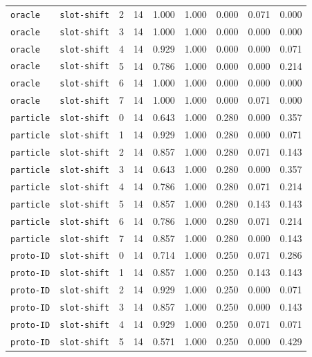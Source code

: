 \documentclass{article}
\begin{document}
\begin{center}
{\begin{tabular}{llllccccc}
\texttt{oracle} & \texttt{slot-shift} & 2 & 14 & 1.000 & 1.000 & 0.000 & 0.071 & 0.000 \\
\texttt{oracle} & \texttt{slot-shift} & 3 & 14 & 1.000 & 1.000 & 0.000 & 0.000 & 0.000 \\
\texttt{oracle} & \texttt{slot-shift} & 4 & 14 & 0.929 & 1.000 & 0.000 & 0.000 & 0.071 \\
\texttt{oracle} & \texttt{slot-shift} & 5 & 14 & 0.786 & 1.000 & 0.000 & 0.000 & 0.214 \\
\texttt{oracle} & \texttt{slot-shift} & 6 & 14 & 1.000 & 1.000 & 0.000 & 0.000 & 0.000 \\
\texttt{oracle} & \texttt{slot-shift} & 7 & 14 & 1.000 & 1.000 & 0.000 & 0.071 & 0.000 \\
\texttt{particle} & \texttt{slot-shift} & 0 & 14 & 0.643 & 1.000 & 0.280 & 0.000 & 0.357 \\
\texttt{particle} & \texttt{slot-shift} & 1 & 14 & 0.929 & 1.000 & 0.280 & 0.000 & 0.071 \\
\texttt{particle} & \texttt{slot-shift} & 2 & 14 & 0.857 & 1.000 & 0.280 & 0.071 & 0.143 \\
\texttt{particle} & \texttt{slot-shift} & 3 & 14 & 0.643 & 1.000 & 0.280 & 0.000 & 0.357 \\
\texttt{particle} & \texttt{slot-shift} & 4 & 14 & 0.786 & 1.000 & 0.280 & 0.071 & 0.214 \\
\texttt{particle} & \texttt{slot-shift} & 5 & 14 & 0.857 & 1.000 & 0.280 & 0.143 & 0.143 \\
\texttt{particle} & \texttt{slot-shift} & 6 & 14 & 0.786 & 1.000 & 0.280 & 0.071 & 0.214 \\
\texttt{particle} & \texttt{slot-shift} & 7 & 14 & 0.857 & 1.000 & 0.280 & 0.000 & 0.143 \\
\texttt{proto-ID} & \texttt{slot-shift} & 0 & 14 & 0.714 & 1.000 & 0.250 & 0.071 & 0.286 \\
\texttt{proto-ID} & \texttt{slot-shift} & 1 & 14 & 0.857 & 1.000 & 0.250 & 0.143 & 0.143 \\
\texttt{proto-ID} & \texttt{slot-shift} & 2 & 14 & 0.929 & 1.000 & 0.250 & 0.000 & 0.071 \\
\texttt{proto-ID} & \texttt{slot-shift} & 3 & 14 & 0.857 & 1.000 & 0.250 & 0.000 & 0.143 \\
\texttt{proto-ID} & \texttt{slot-shift} & 4 & 14 & 0.929 & 1.000 & 0.250 & 0.071 & 0.071 \\
\texttt{proto-ID} & \texttt{slot-shift} & 5 & 14 & 0.571 & 1.000 & 0.250 & 0.000 & 0.429 \\
\bottomrule
\end{tabular}%
}
\end{center}
\end{document}
